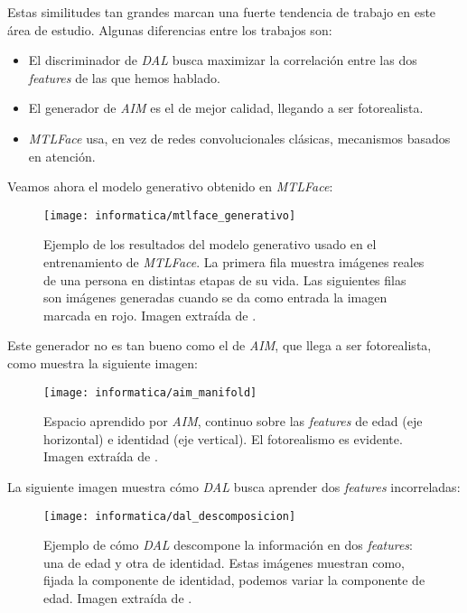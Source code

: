 Estas similitudes tan grandes marcan una fuerte tendencia de trabajo en este área de estudio. Algunas diferencias entre los trabajos son:

\begin{itemize}
	\item El discriminador de \textit{DAL} busca maximizar la correlación entre las dos \textit{features} de las que hemos hablado.
	\item El generador de \textit{AIM} es el de mejor calidad, llegando a ser fotorealista.
	\item \textit{MTLFace} usa, en vez de redes convolucionales clásicas, mecanismos basados en atención.
\end{itemize}

Veamos ahora el modelo generativo obtenido en \textit{MTLFace}:

\begin{figure}[H]
	\centering
	\texttt{[image: informatica/mtlface\_generativo]}
	\caption{Ejemplo de los resultados del modelo generativo usado en el entrenamiento de \textit{MTLFace}. La primera fila muestra imágenes reales de una persona en distintas etapas de su vida. Las siguientes filas son imágenes generadas cuando se da como entrada la imagen marcada en rojo. Imagen extraída de \cite{informatica:best_fgnet_model}.}
\end{figure}

Este generador no es tan bueno como el de \textit{AIM}, que llega a ser fotorealista, como muestra la siguiente imagen:

\begin{figure}[H]
	\centering
	\texttt{[image: informatica/aim\_manifold]}
	\caption{Espacio aprendido por \textit{AIM}, continuo sobre las \textit{features} de edad (eje horizontal) e identidad (eje vertical). El fotorealismo es evidente. Imagen extraída de \cite{informatica:aim}.}
\end{figure}

La siguiente imagen muestra cómo \textit{DAL} busca aprender dos \textit{features} incorreladas:

\begin{figure}[H]
	\centering
	\texttt{[image: informatica/dal\_descomposicion]}
	\caption{Ejemplo de cómo \textit{DAL} descompone la información en dos \textit{features}: una de edad y otra de identidad. Estas imágenes muestran como, fijada la componente de identidad, podemos variar la componente de edad. Imagen extraída de \cite{informatica:dal}.}
\end{figure}

